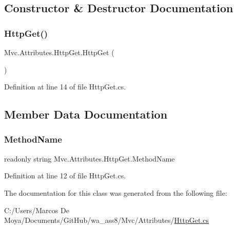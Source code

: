\subsection{Constructor \& Destructor Documentation}
\mbox{\label{class_mvc_1_1_attributes_1_1_http_get_aa0d0bdd66c44edb19f1089e6afd5c192}} 
\subsubsection{\texorpdfstring{Http\+Get()}{HttpGet()}}
{\footnotesize\ttfamily Mvc.\+Attributes.\+Http\+Get.\+Http\+Get (\begin{DoxyParamCaption}{ }\end{DoxyParamCaption})}



Definition at line 14 of file Http\+Get.\+cs.



\subsection{Member Data Documentation}
\mbox{\label{class_mvc_1_1_attributes_1_1_http_get_a203e3cb85a69ad40d2a139804579ad3d}} 
\subsubsection{\texorpdfstring{Method\+Name}{MethodName}}
{\footnotesize\ttfamily readonly string Mvc.\+Attributes.\+Http\+Get.\+Method\+Name}



Definition at line 12 of file Http\+Get.\+cs.



The documentation for this class was generated from the following file\+:\begin{DoxyCompactItemize}
\item 
C\+:/\+Users/\+Marcos De Moya/\+Documents/\+Git\+Hub/wa\+\_\+ass8/\+Mvc/\+Attributes/\hyperlink{_http_get_8cs}{Http\+Get.\+cs}\end{DoxyCompactItemize}
